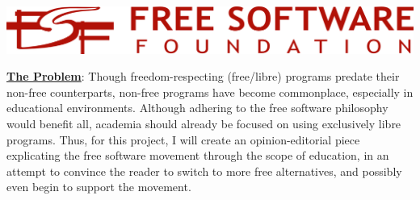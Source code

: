 \documentclass[12pt]{article}
\begin{document}
\begin{center}
  \includegraphics[width=.9\textwidth]{Images/FSFLogo.png}
\end{center}

\begin{tcolorbox}

\underline{\textbf{The Problem}}: Though freedom-respecting (free/libre) programs predate their non-free counterparts, non-free programs have become commonplace, especially in educational environments. Although adhering to the free software philosophy would benefit all, academia should already be focused on using exclusively libre programs. Thus, for this project, I will create an opinion-editorial piece explicating the free software movement through the scope of education, in an attempt to convince the reader to switch to more free alternatives, and possibly even begin to support the movement.

\end{tcolorbox}
\end{document}
